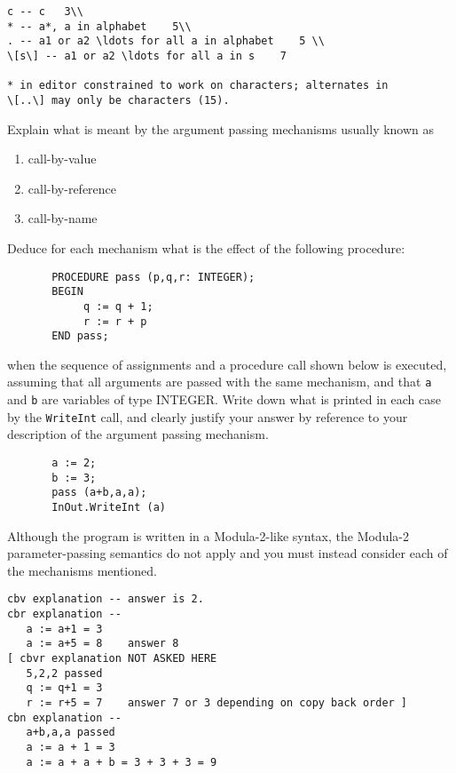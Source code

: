 \begin{questions}
\begin{subquestions}
\begin{modelanswer}
\begin{verbatim}
c -- c   3\\
* -- a*, a in alphabet    5\\
. -- a1 or a2 \ldots for all a in alphabet    5 \\
\[s\] -- a1 or a2 \ldots for all a in s    7

* in editor constrained to work on characters; alternates in
\[..\] may only be characters (15).
\end{verbatim}
\end{modelanswer}  


\subquestion

Explain what is meant by the argument passing mechanisms usually
        known as
                \begin{enumerate}
                \item call-by-value
                \item call-by-reference
                \item call-by-name
                \end{enumerate}
        Deduce for each mechanism what is the effect of
        the following procedure:
\begin{verbatim}
       PROCEDURE pass (p,q,r: INTEGER);
       BEGIN
            q := q + 1;
            r := r + p
       END pass;
\end{verbatim}
        when the sequence of assignments and a procedure call
        shown below is executed, assuming that all arguments are
        passed with the same mechanism, and that \verb"a" and
        \verb"b" are variables of type INTEGER.
        Write down what is printed in each case by the \verb"WriteInt"
        call, and clearly justify your answer by reference to your
        description of the argument passing mechanism.
\begin{verbatim}
       a := 2;
       b := 3;
       pass (a+b,a,a);
       InOut.WriteInt (a)
\end{verbatim}
Although the program is written in a Modula-2-like syntax,
the Modula-2 parameter-passing semantics do not apply and you must
instead consider each of the mechanisms mentioned.

\begin{modelanswer}
\begin{verbatim}
cbv explanation -- answer is 2.
cbr explanation -- 
   a := a+1 = 3
   a := a+5 = 8    answer 8
[ cbvr explanation NOT ASKED HERE
   5,2,2 passed
   q := q+1 = 3
   r := r+5 = 7    answer 7 or 3 depending on copy back order ]
cbn explanation --
   a+b,a,a passed
   a := a + 1 = 3
   a := a + a + b = 3 + 3 + 3 = 9 
\end{verbatim}
\end{modelanswer}


\end{subquestions}
\end{questions}
